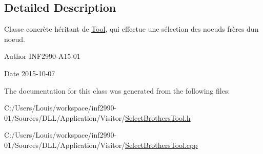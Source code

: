 \subsection{Detailed Description}
Classe concrète héritant de \hyperlink{class_tool}{Tool}, qui effectue une sélection des noeuds frères d\textquotesingle{}un noeud. 

\begin{DoxyAuthor}{Author}
I\+N\+F2990-\/\+A15-\/01 
\end{DoxyAuthor}
\begin{DoxyDate}{Date}
2015-\/10-\/07 
\end{DoxyDate}


The documentation for this class was generated from the following files\+:\begin{DoxyCompactItemize}
\item 
C\+:/\+Users/\+Louis/workspace/inf2990-\/01/\+Sources/\+D\+L\+L/\+Application/\+Visitor/\hyperlink{_select_brothers_tool_8h}{Select\+Brothers\+Tool.\+h}\item 
C\+:/\+Users/\+Louis/workspace/inf2990-\/01/\+Sources/\+D\+L\+L/\+Application/\+Visitor/\hyperlink{_select_brothers_tool_8cpp}{Select\+Brothers\+Tool.\+cpp}\end{DoxyCompactItemize}
